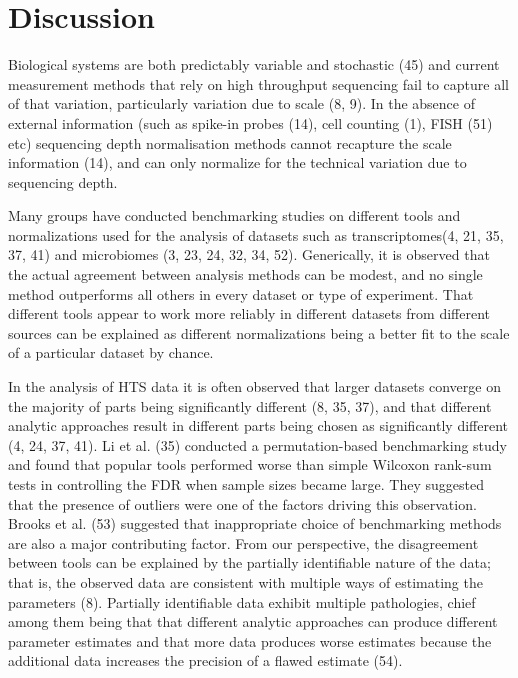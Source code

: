 \documentclass[
]{article}
\begin{document}
\section{Discussion}\label{discussion}

\doublespacing
\singlespacing

Biological systems are both predictably variable and stochastic (45) and
current measurement methods that rely on high throughput sequencing fail
to capture all of that variation, particularly variation due to scale
(8, 9). In the absence of external information (such as spike-in probes
(14), cell counting (1), FISH (51) etc) sequencing depth normalisation
methods cannot recapture the scale information (14), and can only
normalize for the technical variation due to sequencing depth.

Many groups have conducted benchmarking studies on different tools and
normalizations used for the analysis of datasets such as
transcriptomes(4, 21, 35, 37, 41) and microbiomes (3, 23, 24, 32, 34,
52). Generically, it is observed that the actual agreement between
analysis methods can be modest, and no single method outperforms all
others in every dataset or type of experiment. That different tools
appear to work more reliably in different datasets from different
sources can be explained as different normalizations being a better fit
to the scale of a particular dataset by chance.

In the analysis of HTS data it is often observed that larger datasets
converge on the majority of parts being significantly different (8, 35,
37), and that different analytic approaches result in different parts
being chosen as significantly different (4, 24, 37, 41). Li et al. (35)
conducted a permutation-based benchmarking study and found that popular
tools performed worse than simple Wilcoxon rank-sum tests in controlling
the FDR when sample sizes became large. They suggested that the presence
of outliers were one of the factors driving this observation. Brooks et
al. (53) suggested that inappropriate choice of benchmarking methods are
also a major contributing factor. From our perspective, the disagreement
between tools can be explained by the partially identifiable nature of
the data; that is, the observed data are consistent with multiple ways
of estimating the parameters (8). Partially identifiable data exhibit
multiple pathologies, chief among them being that that different
analytic approaches can produce different parameter estimates and that
more data produces worse estimates because the additional data increases
the precision of a flawed estimate (54).
\end{document}
